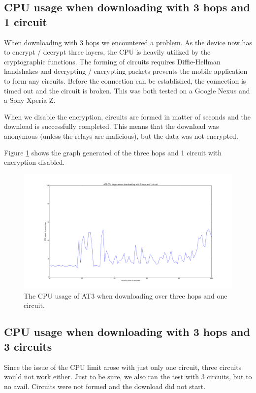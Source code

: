 	\subsection{CPU usage when downloading with 3 hops and 1 circuit}
		\label{ssec:3_hops_1_circuit}
		When downloading with 3 hops we encountered a problem. As the device now has to encrypt / decrypt three layers, the CPU is heavily utilized by the cryptographic functions. The forming of circuits requires Diffie-Hellman handshakes and decrypting / encrypting packets prevents the mobile application to form any circuits. Before the connection can be established, the connection is timed out and the circuit is broken. This was both tested on a Google Nexus and a Sony Xperia Z.
		
		When we disable the encryption, circuits are formed in matter of seconds and the download is successfully completed.
		This means that the download was anonymous (unless the relays are malicious), but the data was not encrypted.
		
		Figure \ref{fig:cpu_3_hops_1_circuit} shows the graph generated of the three hops and 1 circuit with encryption disabled.
		
		\begin{figure}[!h]
			\centering
			\includegraphics[width=\textwidth]{graphics/cpu_usage_3_hops_1_circuit.pdf}
			\caption{The CPU usage of AT3 when downloading over three hops and one circuit.}
			\label{fig:cpu_3_hops_1_circuit}
		\end{figure}
		
	\subsection{CPU usage when downloading with 3 hops and 3 circuits}
		Since the issue of the CPU limit arose with just only one circuit, three circuits would not work either.
		Just to be sure, we also ran the test with 3 circuits, but to no avail. Circuits were not formed and the download did not start.
		
